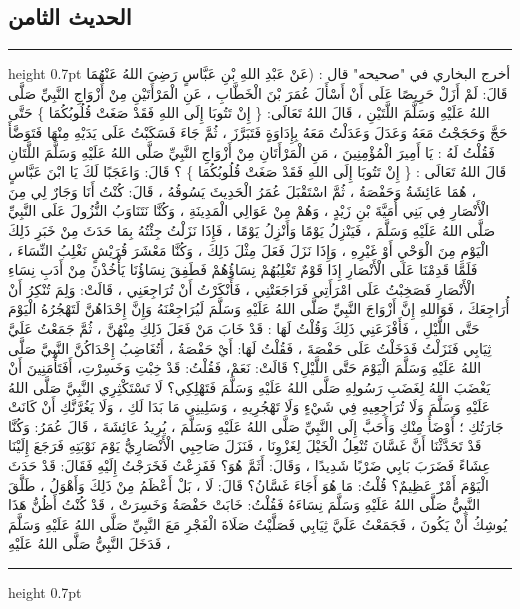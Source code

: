 \documentclass[12pt,openany]{book}
\newenvironment{hadithblock}
  {\par\medskip\noindent\begin{minipage}{\linewidth}\hrule height 0.7pt \vspace{0.6em}\small}
  {\vspace{0.4em}\hrule height 0.7pt\end{minipage}\par\medskip}
\begin{document}
\subsection*{الحديث الثامن}
\begin{hadithblock}
أخرج البخاري في "صحيحه" قال : (عَنْ عَبْدِ اللهِ بْنِ عَبَّاسٍ رَضِيَ اللهُ عَنْهُمَا قَالَ: لَمْ أَزَلْ حَرِيصًا عَلَى أَنْ أَسْأَلَ عُمَرَ بْنَ الْخَطَّابِ ، عَنِ الْمَرْأَتَيْنِ مِنْ أَزْوَاجِ النَّبِيِّ صَلَّى اللهُ عَلَيْهِ وَسَلَّمَ اللَّتَيْنِ ، قَالَ اللهُ تَعَالَى: \{ إِنْ تَتُوبَا إِلَى اللهِ فَقَدْ صَغَتْ قُلُوبُكُمَا \} حَتَّى حَجَّ وَحَجَجْتُ مَعَهُ وَعَدَلَ وَعَدَلْتُ مَعَهُ بِإِدَاوَةٍ فَتَبَرَّزَ ، ثُمَّ جَاءَ فَسَكَبْتُ عَلَى يَدَيْهِ مِنْهَا فَتَوَضَّأَ فَقُلْتُ لَهُ : يَا أَمِيرَ الْمُؤْمِنِينَ ، مَنِ الْمَرْأَتَانِ مِنْ أَزْوَاجِ النَّبِيِّ صَلَّى اللهُ عَلَيْهِ وَسَلَّمَ اللَّتَانِ قَالَ اللهُ تَعَالَى : \{ إِنْ تَتُوبَا إِلَى اللهِ فَقَدْ صَغَتْ قُلُوبُكُمَا \} ؟ قَالَ: وَاعَجَبًا لَكَ يَا ابْنَ عَبَّاسٍ ، هُمَا عَائِشَةُ وَحَفْصَةُ ، ثُمَّ اسْتَقْبَلَ عُمَرُ الْحَدِيثَ يَسُوقُهُ ، قَالَ: كُنْتُ أَنَا وَجَارٌ لِي مِنَ الْأَنْصَارِ فِي بَنِي أُمَيَّةَ بْنِ زَيْدٍ ، وَهُمْ مِنْ عَوَالِي الْمَدِينَةِ ، وَكُنَّا نَتَنَاوَبُ النُّزُولَ عَلَى النَّبِيِّ صَلَّى اللهُ عَلَيْهِ وَسَلَّمَ ، فَيَنْزِلُ يَوْمًا وَأَنْزِلُ يَوْمًا ، فَإِذَا نَزَلْتُ جِئْتُهُ بِمَا حَدَثَ مِنْ خَبَرِ ذَلِكَ الْيَوْمِ مِنَ الْوَحْيِ أَوْ غَيْرِهِ ، وَإِذَا نَزَلَ فَعَلَ مِثْلَ ذَلِكَ ، وَكُنَّا مَعْشَرَ قُرَيْشٍ نَغْلِبُ النِّسَاءَ ، فَلَمَّا قَدِمْنَا عَلَى الْأَنْصَارِ إِذَا قَوْمٌ تَغْلِبُهُمْ نِسَاؤُهُمْ فَطَفِقَ نِسَاؤُنَا يَأْخُذْنَ مِنْ أَدَبِ نِسَاءِ الْأَنْصَارِ فَصَخِبْتُ عَلَى امْرَأَتِي فَرَاجَعَتْنِي ، فَأَنْكَرْتُ أَنْ تُرَاجِعَنِي ، قَالَتْ: وَلِمَ تُنْكِرُ أَنْ أُرَاجِعَكَ ، فَوَاللهِ إِنَّ أَزْوَاجَ النَّبِيِّ صَلَّى اللهُ عَلَيْهِ وَسَلَّمَ لَيُرَاجِعْنَهُ وَإِنَّ إِحْدَاهُنَّ لَتَهْجُرُهُ الْيَوْمَ حَتَّى اللَّيْلِ ، فَأَفْزَعَنِي ذَلِكَ وَقُلْتُ لَهَا : قَدْ خَابَ مَنْ فَعَلَ ذَلِكِ مِنْهُنَّ ، ثُمَّ جَمَعْتُ عَلَيَّ ثِيَابِي فَنَزَلْتُ فَدَخَلْتُ عَلَى حَفْصَةَ ، فَقُلْتُ لَهَا: أَيْ حَفْصَةُ ، أَتُغَاضِبُ إِحْدَاكُنَّ النَّبِيَّ صَلَّى اللهُ عَلَيْهِ وَسَلَّمَ الْيَوْمَ حَتَّى اللَّيْلِ؟ قَالَتْ: نَعَمْ، فَقُلْتُ: قَدْ خِبْتِ وَخَسِرْتِ، أَفَتَأْمَنِينَ أَنْ يَغْضَبَ اللهُ لِغَضَبِ رَسُولِهِ صَلَّى اللهُ عَلَيْهِ وَسَلَّمَ فَتَهْلِكِي؟ لَا تَسْتَكْثِرِي النَّبِيَّ صَلَّى اللهُ عَلَيْهِ وَسَلَّمَ وَلَا تُرَاجِعِيهِ فِي شَيْءٍ وَلَا تَهْجُرِيهِ ، وَسَلِينِي مَا بَدَا لَكِ ، وَلَا يَغُرَّنَّكِ أَنْ كَانَتْ جَارَتُكِ ؛ أَوْضَأَ مِنْكِ وَأَحَبَّ إِلَى النَّبِيِّ صَلَّى اللهُ عَلَيْهِ وَسَلَّمَ ، يُرِيدُ عَائِشَةَ ، قَالَ عُمَرُ: وَكُنَّا قَدْ تَحَدَّثْنَا أَنَّ غَسَّانَ تُنْعِلُ الْخَيْلَ لِغَزْوِنَا ، فَنَزَلَ صَاحِبِي الْأَنْصَارِيُّ يَوْمَ نَوْبَتِهِ فَرَجَعَ إِلَيْنَا عِشَاءً فَضَرَبَ بَابِي ضَرْبًا شَدِيدًا ، وَقَالَ: أَثَمَّ هُوَ؟ فَفَزِعْتُ فَخَرَجْتُ إِلَيْهِ فَقَالَ: قَدْ حَدَثَ الْيَوْمَ أَمْرٌ عَظِيمٌ؟ قُلْتُ: مَا هُوَ أَجَاءَ غَسَّانُ؟ قَالَ: لَا ، بَلْ أَعْظَمُ مِنْ ذَلِكَ وَأَهْوَلُ ، طَلَّقَ النَّبِيُّ صَلَّى اللهُ عَلَيْهِ وَسَلَّمَ نِسَاءَهُ فَقُلْتُ: خَابَتْ حَفْصَةُ وَخَسِرَتْ ، قَدْ كُنْتُ أَظُنُّ هَذَا يُوشِكُ أَنْ يَكُونَ ، فَجَمَعْتُ عَلَيَّ ثِيَابِي فَصَلَّيْتُ صَلَاةَ الْفَجْرِ مَعَ النَّبِيِّ صَلَّى اللهُ عَلَيْهِ وَسَلَّمَ ، فَدَخَلَ النَّبِيُّ صَلَّى اللهُ عَلَيْهِ 
\end{hadithblock}
\end{document}
